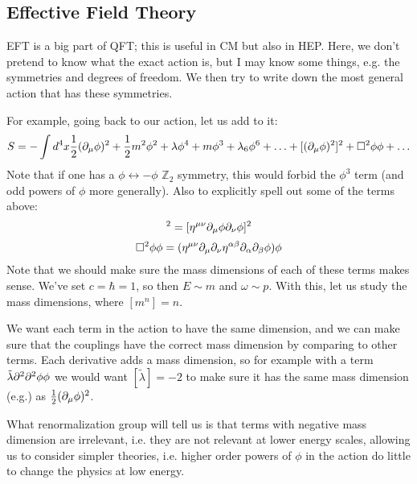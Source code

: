 \subsection{Effective Field Theory}
EFT is a big part of QFT; this is useful in CM but also in HEP. Here, we don't pretend to know what the exact action is, but I may know some things, e.g. the symmetries and degrees of freedom. We then try to write down the most general action that has these symmetries. 

For example, going back to our action, let us add to it:
\begin{equation}
    S = -\int d^4x \frac{1}{2}(\partial_\mu \phi)^2 + \frac{1}{2}m^2\phi^2 + \lambda \phi^4 + m\phi^3 + \lambda_6 \phi^6 + \ldots + [(\partial_\mu \phi )^2]^2 + \square^2 \phi \phi + \ldots 
\end{equation}
Note that if one has a $\phi \leftrightarrow -\phi$ $\mathbb{Z}_2$ symmetry, this would forbid the $\phi^3$ term (and odd powers of $\phi$ more generally). Also to explicitly spell out some of the terms above:
\begin{equation}
    [(\p_\mu \phi)^2]^2 = [\eta^{\mu\nu}\p_\mu \phi \p_\nu \phi]^2
\end{equation}
\begin{equation}
    \square^2 \phi \phi  = (\eta^{\mu\nu}\partial_\mu\partial_\nu \eta^{\alpha\beta}\partial_\alpha\partial_\beta \phi)\phi
\end{equation}
Note that we should make sure the mass dimensions of each of these terms makes sense. We've set $c = \hbar = 1$, so then $E \sim m$ and $\omega \sim p$. With this, let us study the mass dimensions, where $[m^n] = n$. 

We want each term in the action to have the same dimension, and we can make sure that the couplings have the correct mass dimension by comparing to other terms. Each derivative adds a mass dimension, so for example with a term $\tilde{\lambda}\partial^2\partial^2\phi \phi$ we would want $[\tilde{\lambda}] = -2$ to make sure it has the same mass dimension (e.g.) as $\frac{1}{2}(\partial_\mu \phi)^2$.

What renormalization group will tell us is that terms with negative mass dimension are irrelevant, i.e. they are not relevant at lower energy scales, allowing us to consider simpler theories, i.e. higher order powers of $\phi$ in the action do little to change the physics at low energy.